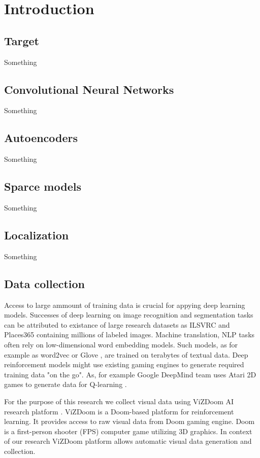 
\chapter{Introduction}
\label{cha:Introduction}

\section{Target}
Something


\section{Convolutional Neural Networks}
Something \cite{Kempka2016}

\section{Autoencoders}
Something \cite{Kempka2016}

\section{Sparce models}
Something \cite{Kempka2016}

\section{Localization}
Something \cite{Kempka2016}

\section{Data collection}
Access to large ammount of training data is crucial for appying deep learning models.
Successes of deep learning on image recognition and segmentation tasks can be attributed to existance of large research datasets as ILSVRC and Places365 \cite{ILSVRC15, Zhou2016} containing millions of labeled images.
Machine translation, NLP tasks \cite{Karpathy2014, Kim2014} often rely on low-dimensional word embedding models.
Such models, as for example as word2vec or Glove \cite{Mikolov2013, pennington2014glove}, are trained on terabytes of textual data.
Deep reinforcement models might use existing gaming engines to generate required training data "on the go".
As, for example Google DeepMind team uses Atari 2D games to generate data for Q-learning \cite{Mnih2013}.

For the purpose of this research we collect visual data using ViZDoom AI research platform \cite{Kempka2016}.
ViZDoom is a Doom-based platform for reinforcement learning.
It provides access to raw visual data from Doom gaming engine.
Doom is a first-person shooter (FPS) computer game utilizing 3D graphics.
In context of our research ViZDoom platform allows automatic visual data generation and collection.

